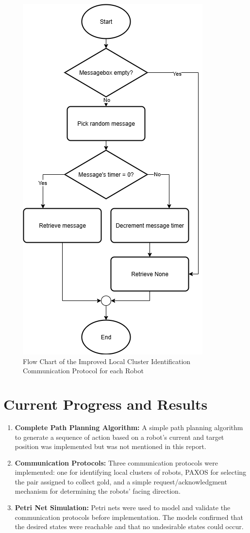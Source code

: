 \documentclass[12pt,a4paper]{article}
\begin{document}
\begin{figure}
    \centering
    \includegraphics[width=0.6\linewidth]{images/message_flow.png}
    \caption{Flow Chart of the Improved Local Cluster Identification Communication Protocol for each Robot}   
    \label{fig:continuous-flowchart}
\end{figure}

\section{Current Progress and Results}
\begin{enumerate}
    \item \textbf{Complete Path Planning Algorithm:} A simple path planning algorithm to generate a sequence of action based on a robot's current and target position was implemented but was not mentioned in this report.
    \item \textbf{Communication Protocols:} Three communication protocols were implemented: one for identifying local clusters of robots, PAXOS for selecting the pair assigned to collect gold, and a simple request/acknowledgment mechanism for determining the robots’ facing direction.
    \item \textbf{Petri Net Simulation:} Petri nets were used to model and validate the communication protocols before implementation. The models confirmed that the desired states were reachable and that no undesirable states could occur.
\end{enumerate}
\end{document}
